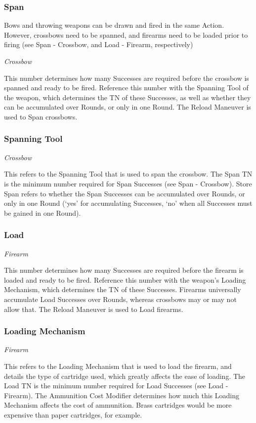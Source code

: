 \documentclass[oneside,11pt,english]{book}
\begin{document}
\subsubsection{Span}
Bows and throwing weapons can be drawn and fired in the same Action. However, crossbows need to be 
spanned, and firearms need to be loaded prior to firing (see Span - Crossbow, and Load - Firearm, 
respectively)

\vspace{-10pt}\emph{Crossbow}

This number determines how many Successes are required before the crossbow is spanned and ready to 
be fired. Reference this number with the Spanning Tool of the weapon, which determines the TN of these 
Successes, as well as whether they can be accumulated over Rounds, or only in one Round. The Reload 
Maneuver is used to Span crossbows. 

\subsubsection{Spanning Tool}
\vspace{-10pt}\emph{Crossbow}

This refers to the Spanning Tool that is used to span the crossbow. The Span TN is the minimum number 
required for Span Successes (see Span - Crossbow). Store Span refers to whether the Span Successes can 
be accumulated over Rounds, or only in one Round (‘yes’ for accumulating Successes, ‘no’ when all 
Successes must be gained in one Round). 

\subsubsection{Load}
\vspace{-10pt}\emph{Firearm}\par
This number determines how many Successes are required before the firearm is loaded and ready to be 
fired. Reference this number with the weapon’s Loading Mechanism, which determines the TN of these 
Successes. Firearms universally accumulate Load Successes over Rounds, whereas crossbows may or 
may not allow that. The Reload Maneuver is used to Load firearms. 

\subsubsection{Loading Mechanism}
\vspace{-10pt}\emph{Firearm}\par
This refers to the Loading Mechanism that is used to load the firearm, and details the type of cartridge 
used, which greatly affects the ease of loading. The Load TN is the minimum number required for Load 
Successes (see Load - Firearm). The Ammunition Cost Modifier determines how much this Loading 
Mechanism affects the cost of ammunition. Brass cartridges would be more expensive than paper cartridges, for example. 
\end{document}
